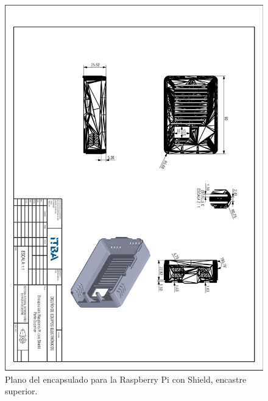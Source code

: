 \begin{figure}[H]
	\centering
	\includegraphics[width=\linewidth]{ImagenesApendice/RpiCasingTop}
	\caption{Plano del encapsulado para la Raspberry Pi con Shield, encastre superior.}
	\label{fig:RpiCasingTop}
\end{figure}

